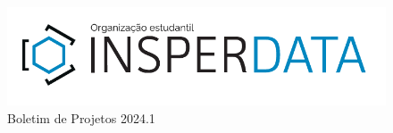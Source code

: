 \documentclass[
    10pt, 
    a4paper, 
    ]{article}
\begin{document}
\begin{figure}
    \centering
    \includegraphics[width = .8\textwidth]{logo/logo_nova.pdf}
    \vspace{10pt}
    \caption*{\Huge Boletim de Projetos 2024.1}
\end{figure}
\clearpage

\tableofcontents











\end{document}
